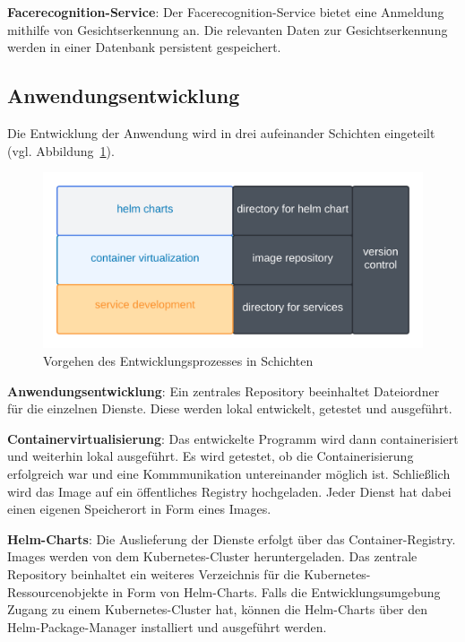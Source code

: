 \textbf{Facerecognition-Service}: Der Facerecognition-Service bietet eine Anmeldung mithilfe von Gesichtserkennung an.
Die relevanten Daten zur Gesichtserkennung werden in einer Datenbank persistent gespeichert.

\subsection{Anwendungsentwicklung}
Die Entwicklung der Anwendung wird in drei aufeinander Schichten eingeteilt (vgl. Abbildung~\ref{fig:Schichtenentwurf}).

\begin{figure}[!htb]
    \centering
    \includegraphics[width=1.0\columnwidth]{images/Schichtenentwurf.png}
    \caption{Vorgehen des Entwicklungsprozesses in Schichten}
    \label{fig:Schichtenentwurf}
  \end{figure}

\textbf{Anwendungsentwicklung}: 
Ein zentrales Repository beeinhaltet Dateiordner für die einzelnen Dienste.
Diese werden lokal entwickelt, getestet und ausgeführt.

\textbf{Containervirtualisierung}: 
Das entwickelte Programm wird dann containerisiert und weiterhin lokal ausgeführt.
Es wird getestet, ob die Containerisierung erfolgreich war und eine Kommmunikation untereinander möglich ist. 
Schließlich wird das Image auf ein öffentliches Registry hochgeladen. 
Jeder Dienst hat dabei einen eigenen Speicherort in Form eines Images.

\textbf{Helm-Charts}: 
Die Auslieferung der Dienste erfolgt über das Container-Registry.
Images werden von dem Kubernetes-Cluster heruntergeladen.
Das zentrale Repository beinhaltet ein weiteres Verzeichnis für die Kubernetes-Ressourcenobjekte in Form von Helm-Charts.
Falls die Entwicklungsumgebung Zugang zu einem Kubernetes-Cluster hat, können die Helm-Charts über den Helm-Package-Manager installiert und ausgeführt werden.

